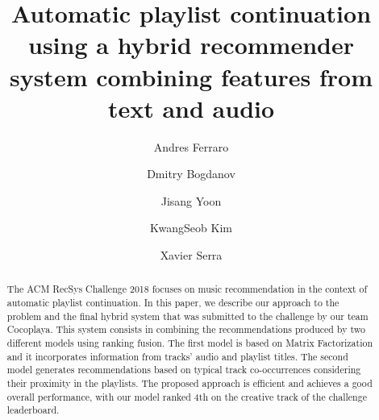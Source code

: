 \documentclass[sigconf]{acmart}
\begin{document}
\title[APC using a hybrid system combining features from text and audio]{Automatic playlist continuation using a hybrid recommender system combining features from text and audio}



\author{Andres Ferraro}

\author{Dmitry Bogdanov}

\author{Jisang Yoon}

\author{KwangSeob Kim}

\author{Xavier Serra}

\renewcommand{\shortauthors}{A. Ferraro et al.}


\begin{abstract}
The ACM RecSys Challenge 2018 focuses on music recommendation in the context of automatic playlist continuation. In this paper, we describe our approach to the problem and the final hybrid system that was submitted to the challenge by our team Cocoplaya. This system consists in combining the recommendations produced by two different models using ranking fusion. The first model is based on Matrix Factorization and it incorporates information from tracks' audio and playlist titles. The second model generates recommendations based on typical track co-occurrences considering their proximity in the playlists. The proposed approach is efficient and achieves a good overall performance, with our model ranked 4th on the creative track of the challenge leaderboard.
%
\end{abstract}
\end{document}
